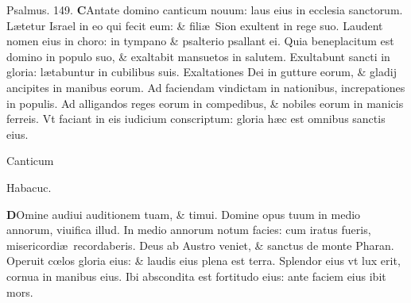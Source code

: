\documentclass[a5paper,10pt]{book}
\def\ae{æ}
\def\oe{œ}
\begin{document}
\begin{multicols*}{2}
\newline \color{red} Psalmus. \hypertarget{ps149}{149.} \color{black}
\lettrine[lines=2]{\bfseries \color{red} C}{}Antate domino canticum nouum: laus eius in ecclesia sanctorum.
\newline \color{red} L\color{black}\ae tetur Israel in eo qui fecit eum: \& fili\ae \ Sion exultent in rege suo. %
\newline \color{red} L\color{black}audent nomen eius in choro: in tympano \& psalterio psallant ei.
\newline \color{red} Q\color{black}uia beneplacitum est domino in populo suo, \& exaltabit mansuetos in salutem.
\newline \color{red} E\color{black}xultabunt sancti in gloria: l\ae tabuntur in cubilibus suis.
\newline \color{red} E\color{black}xaltationes Dei in gutture eorum, \& gladij ancipites in manibus eorum.
\newline \color{red} A\color{black}d faciendam vindictam in nationibus, increpationes in populis.
\newline \color{red} A\color{black}d alligandos reges eorum in compedibus, \& nobiles eorum in manicis ferreis.
\newline \color{red} V\color{black}t faciant in eis iudicium conscriptum: gloria h\ae c est omnibus sanctis eius.
\vspace{-1em}
\begin{center} \color{red}
\hypertarget{Habakkuk}{Canticum} Habacuc.
\end{center}
\vspace{-1em}
\lettrine[lines=2]{\bfseries \color{red} D}{}Omine audiui auditionem tuam, \& timui.
\newline \color{red} D\color{black}omine opus tuum in medio annorum, viuifica illud.
\newline \color{red} I\color{black}n medio annorum notum facies: cum iratus fueris, misericordi\ae \ recordaberis.
\newline \color{red} D\color{black}eus ab Austro veniet, \& sanctus de monte Pharan.
\newline \color{red} O\color{black}peruit c\oe los gloria eius: \& laudis eius plena est terra.
\newline \color{red} S\color{black}plendor eius vt lux erit, cornua in manibus eius.
\newline \color{red} I\color{black}bi abscondita est fortitudo eius: ante faciem eius ibit mors.

\end{multicols*}
\end{document}
